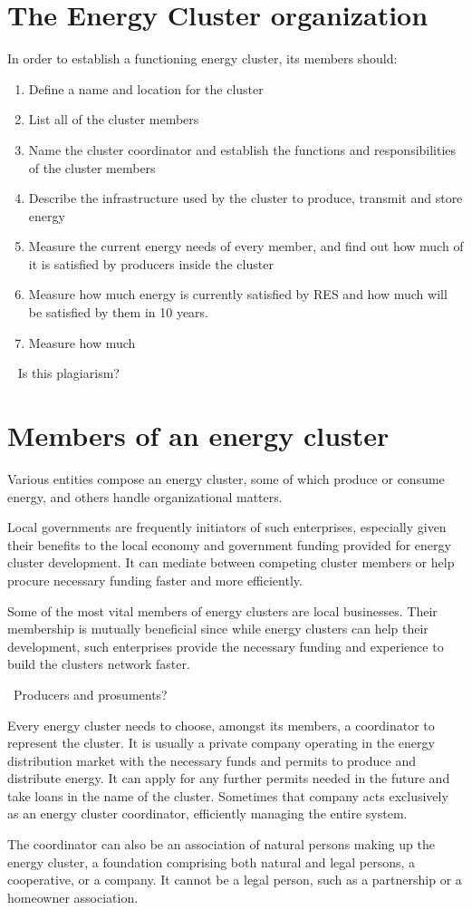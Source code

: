 \section{The Energy Cluster organization}

\par In order to establish a functioning energy cluster, its members should:
\begin{enumerate}
  \item Define a name and location for the cluster
  \item List all of the cluster members
  \item Name the cluster coordinator and establish the functions and responsibilities of the cluster members
  \item Describe the infrastructure used by the cluster to produce, transmit and store energy
  \item Measure the current energy needs of every member, and find out how much of it is satisfied by producers inside the cluster
  \item Measure how much energy is currently satisfied by RES and how much will be satisfied by them in 10 years.
  \item Measure how much
\end{enumerate}
~ Is this plagiarism?

\section{Members of an energy cluster}

\par Various entities compose an energy cluster, some of which produce or consume energy, and others handle organizational matters. 
\par Local governments are frequently initiators of such enterprises, especially given their benefits to the local economy and government funding provided for energy cluster development. It can mediate between competing cluster members or help procure necessary funding faster and more efficiently.
\par Some of the most vital members of energy clusters are local businesses. Their membership is mutually beneficial since while energy clusters can help their development, such enterprises provide the necessary funding and experience to build the clusters network faster.
\par ~Producers and prosuments?
\par Every energy cluster needs to choose, amongst its members, a coordinator to represent the cluster. It is usually a private company operating in the energy distribution market with the necessary funds and permits to produce and distribute energy. It can apply for any further permits needed in the future and take loans in the name of the cluster. Sometimes that company acts exclusively as an energy cluster coordinator, efficiently managing the entire system.
\par The coordinator can also be an association of natural persons making up the energy cluster, a foundation comprising both natural and legal persons, a cooperative, or a company. It cannot be a legal person, such as a partnership or a homeowner association.
